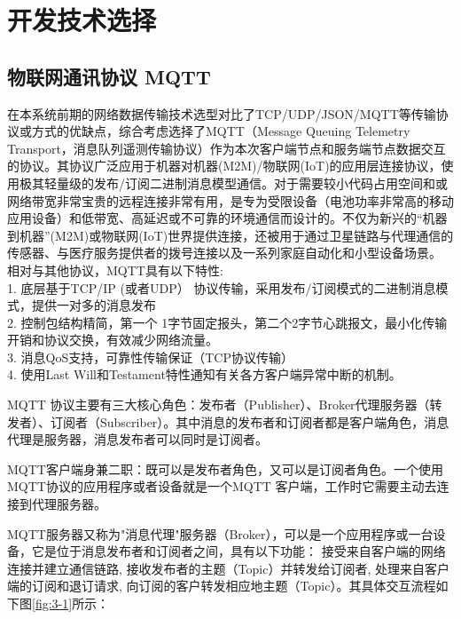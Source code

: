 \section{开发技术选择}

\subsection{物联网通讯协议  MQTT}

在本系统前期的网络数据传输技术选型对比了TCP/UDP/JSON/MQTT等传输协议或方式的优缺点，综合考虑选择了MQTT（Message Queuing Telemetry Transport，消息队列遥测传输协议）作为本次客户端节点和服务端节点数据交互的协议。其协议广泛应用于机器对机器(M2M)/物联网(IoT)的应用层连接协议，使用极其轻量级的发布/订阅二进制消息模型通信。对于需要较小代码占用空间和或网络带宽非常宝贵的远程连接非常有用，是专为受限设备（电池功率非常高的移动应用设备）和低带宽、高延迟或不可靠的环境通信而设计的。不仅为新兴的“机器到机器”(M2M)或物联网(IoT)世界提供连接，还被用于通过卫星链路与代理通信的传感器、与医疗服务提供者的拨号连接以及一系列家庭自动化和小型设备场景。
\\ 相对与其他协议，MQTT具有以下特性:
\\1. 底层基于TCP/IP (或者UDP） 协议传输，采用发布/订阅模式的二进制消息模式，提供一对多的消息发布
\\2. 控制包结构精简，第一个 1字节固定报头，第二个2字节心跳报文，最小化传输开销和协议交换，有效减少网络流量。
\\3. 消息QoS支持，可靠性传输保证（TCP协议传输）
\\4. 使用Last Will和Testament特性通知有关各方客户端异常中断的机制。

MQTT 协议主要有三大核心角色：发布者（Publisher）、Broker代理服务器（转发者）、订阅者（Subscriber）。其中消息的发布者和订阅者都是客户端角色，消息代理是服务器，消息发布者可以同时是订阅者。

MQTT客户端身兼二职：既可以是发布者角色，又可以是订阅者角色。一个使用MQTT协议的应用程序或者设备就是一个MQTT 客户端，工作时它需要主动去连接到代理服务器。

MQTT服务器又称为"消息代理"服务器（Broker），可以是一个应用程序或一台设备，它是位于消息发布者和订阅者之间，具有以下功能：
接受来自客户端的网络连接并建立通信链路,
接收发布者的主题（Topic）并转发给订阅者,
处理来自客户端的订阅和退订请求,
向订阅的客户转发相应地主题（Topic）。其具体交互流程如下图\ref{fig:3-1}所示：

